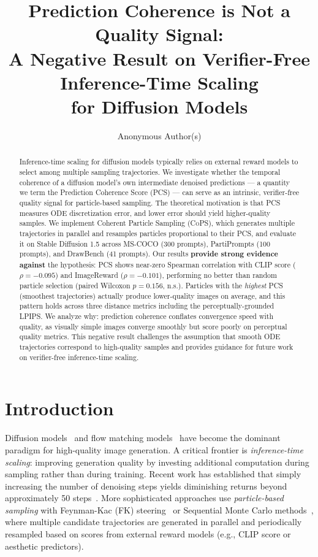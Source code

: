 \documentclass{article}
\title{Prediction Coherence is Not a Quality Signal:\\A Negative Result on Verifier-Free Inference-Time Scaling\\for Diffusion Models}
\author{
  Anonymous Author(s)
}
\newcommand{\cops}{\textsc{CoPS}}
\newcommand{\pcs}{\textsc{PCS}}
\begin{document}
\maketitle

\begin{abstract}
Inference-time scaling for diffusion models typically relies on external reward models to select among multiple sampling trajectories. We investigate whether the temporal coherence of a diffusion model's own intermediate denoised predictions --- a quantity we term the Prediction Coherence Score (\pcs{}) --- can serve as an intrinsic, verifier-free quality signal for particle-based sampling. The theoretical motivation is that \pcs{} measures ODE discretization error, and lower error should yield higher-quality samples. We implement Coherent Particle Sampling (\cops{}), which generates multiple trajectories in parallel and resamples particles proportional to their \pcs{}, and evaluate it on Stable Diffusion 1.5 across MS-COCO (300 prompts), PartiPrompts (100 prompts), and DrawBench (41 prompts). Our results \textbf{provide strong evidence against} the hypothesis: \pcs{} shows near-zero Spearman correlation with CLIP score ($\rho = -0.095$) and ImageReward ($\rho = -0.101$), performing no better than random particle selection (paired Wilcoxon $p = 0.156$, n.s.). Particles with the \emph{highest} \pcs{} (smoothest trajectories) actually produce lower-quality images on average, and this pattern holds across three distance metrics including the perceptually-grounded LPIPS. We analyze why: prediction coherence conflates convergence speed with quality, as visually simple images converge smoothly but score poorly on perceptual quality metrics. This negative result challenges the assumption that smooth ODE trajectories correspond to high-quality samples and provides guidance for future work on verifier-free inference-time scaling.
\end{abstract}

\section{Introduction}

Diffusion models~\citep{ho2020ddpm,song2021ddim} and flow matching models~\citep{lipman2023flow} have become the dominant paradigm for high-quality image generation. A critical frontier is \emph{inference-time scaling}: improving generation quality by investing additional computation during sampling rather than during training. Recent work has established that simply increasing the number of denoising steps yields diminishing returns beyond approximately 50 steps~\citep{ma2025scaling}. More sophisticated approaches use \emph{particle-based sampling} with Feynman-Kac (FK) steering~\citep{singhal2025fk} or Sequential Monte Carlo methods~\citep{skreta2025fkc}, where multiple candidate trajectories are generated in parallel and periodically resampled based on scores from external reward models (e.g., CLIP score or aesthetic predictors).
\end{document}
